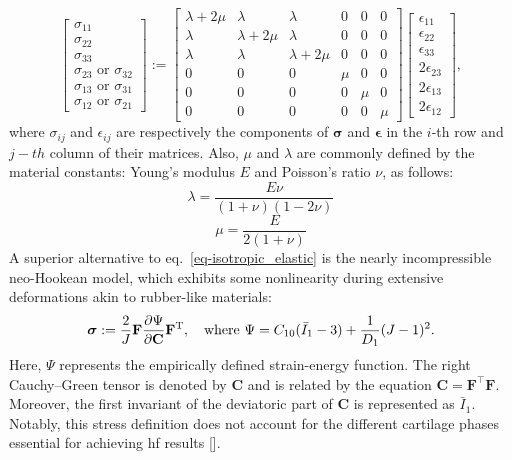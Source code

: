 \documentclass[12pt,a4paper]{report}
\begin{document}
\begin{equation}
\begin{bmatrix}
\sigma_{11} \\
\sigma_{22} \\
\sigma_{33} \\
\sigma_{23} \text{ or } \sigma_{32} \\
\sigma_{13} \text{ or } \sigma_{31} \\
\sigma_{12} \text{ or } \sigma_{21}
\end{bmatrix}
:=
\begin{bmatrix}
\lambda + 2\mu & \lambda & \lambda & 0 & 0 & 0 \\
\lambda & \lambda + 2\mu & \lambda & 0 & 0 & 0 \\
\lambda & \lambda & \lambda + 2\mu & 0 & 0 & 0 \\
0 & 0 & 0 & \mu & 0 & 0 \\
0 & 0 & 0 & 0 & \mu & 0 \\
0 & 0 & 0 & 0 & 0 & \mu
\end{bmatrix}
%
\begin{bmatrix}
\epsilon_{11} \\
\epsilon_{22} \\
\epsilon_{33} \\
2\epsilon_{23} \\
2\epsilon_{13} \\
2\epsilon_{12}
\end{bmatrix},
%
\end{equation}
%
where $\sigma_{ij}$ and $\epsilon_{ij}$ are respectively the components of $\bm{\sigma}$ and $\bm{\epsilon}$ in the $i$-th row and $j-th$ column of their matrices. Also, $\mu$ and $\lambda$ are commonly defined by the material constants: Young's modulus $E$ and Poisson's ratio $\nu$, as follows:
%
\begin{equation}
\lambda = \frac{E \nu}{(1+\nu)(1-2\nu)}
\end{equation}
%
\begin{equation}
\mu = \frac{E}{2(1+\nu)}
\end{equation}
%
A superior alternative to eq.~\ref{eq-isotropic_elastic} is the nearly incompressible neo-Hookean model, which exhibits some nonlinearity during extensive deformations akin to rubber-like materials:
%
\begin{equation}\label{eq-hyperelastic}
\bm{\sigma} :=\frac{2}{J}
\mathbf{F}\frac{\partial\Psi}{\partial\mathbf{C}}\mathbf{F}^{\rm T},
\quad \text{where }
\Psi = C_{10}(\bar{I}_1 - 3) + \frac{1}{D_1}(J - 1)^2.
\end{equation}
%
Here, $\Psi$ represents the empirically defined strain-energy function. The right Cauchy–Green tensor is denoted by \( \mathbf{C} \) and is related by the equation \( \mathbf{C} = \mathbf{F}^{\top} \mathbf{F} \). Moreover, the first invariant of the deviatoric part of \( \mathbf{C} \) is represented as \( \bar{I}_1 \). Notably, this stress definition does not account for the different cartilage phases essential for achieving \ac{hf} results [\cite{gerhard-book}].
\end{document}
